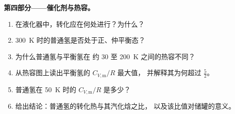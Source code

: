 \begin{problem}
\medskip\noindent\textbf{第四部分——催化剂与热容。}
\begin{enumerate}[resume]
  \item 在液化器中，转化应在何处进行？为什么？
  \item \qty{300}{K} 时的普通氢是否处于正、仲平衡态？
  \item 为什么普通氢与平衡氢在
        约 30 至 \qty{200}{K} 之间的热容不同？
  \item 从热容图上读出平衡氢的 $C_{V,\mathrm m}/R$ 最大值，
        并解释其为何超过 $\frac52$。
  \item 普通氢在 \qty{50}{K} 时的 $C_{V,\mathrm m}/R$ 是多少？
  \item 给出结论：普通氢的转化热与其汽化焓之比，
        以及该比值对储罐的意义。
\end{enumerate}
\end{problem}
